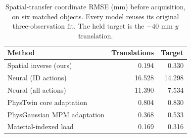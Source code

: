 \begin{table}[t]
\centering\small\setlength{\tabcolsep}{3pt}
\begin{tabular}{lrr}
\toprule
Method & Translations & Target \\
\midrule
Spatial inverse (ours) & 0.194 & 0.330 \\
Neural (ID actions) & 16.528 & 14.298 \\
Neural (all actions) & 11.390 & 7.534 \\
PhysTwin core adaptation & 0.804 & 0.830 \\
PhysGaussian MPM adaptation & 0.368 & 0.533 \\
Material-indexed load & 0.169 & 0.316 \\
\bottomrule
\end{tabular}
\caption{Spatial-transfer coordinate RMSE (mm) before acquisition, on six matched objects. Every model reuses its original three-observation fit. The held target is the $-40$ mm $y$ translation.}
\label{tab:transfer}
\end{table}
